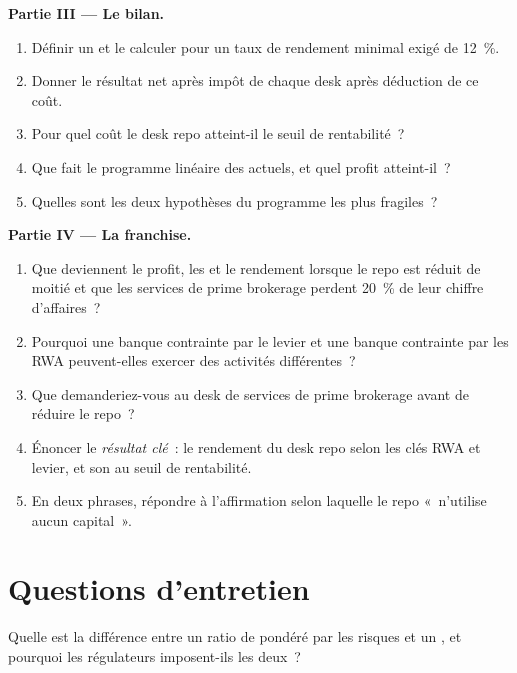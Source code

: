 \begin{problem}
\medskip\noindent\textbf{Partie III --- Le bilan.}
\begin{enumerate}[resume]
\item Définir un  et le calculer pour un taux de rendement minimal exigé de 12~\%.
\item Donner le résultat net après impôt de chaque desk après déduction de ce coût.
\item Pour quel coût le desk repo atteint-il le seuil de rentabilité~?
\item Que fait le programme linéaire des  actuels, et quel profit atteint-il~?
\item Quelles sont les deux hypothèses du programme les plus fragiles~?
\end{enumerate}

\medskip\noindent\textbf{Partie IV --- La franchise.}
\begin{enumerate}[resume]
\item Que deviennent le profit, les  et le rendement lorsque le repo est réduit de moitié et que les services de prime brokerage perdent 20~\% de leur chiffre d'affaires~?
\item Pourquoi une banque contrainte par le levier et une banque contrainte par les RWA peuvent-elles exercer des activités différentes~?
\item Que demanderiez-vous au desk de services de prime brokerage avant de réduire le repo~?
\item Énoncer le \emph{résultat clé}~: le rendement du desk repo selon les clés RWA et levier, et son  au seuil de rentabilité.
\item En deux phrases, répondre à l'affirmation selon laquelle le repo «~n'utilise aucun capital~».
\end{enumerate}
\end{problem}

\section{Questions d'entretien}

\begin{interviewq}\label{iq:fm:the-bank-markets-division:1}
Quelle est la différence entre un ratio de  pondéré par les risques et un , et pourquoi les régulateurs imposent-ils les deux~?
\end{interviewq}


